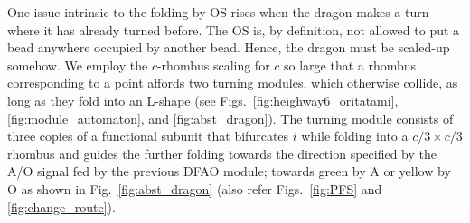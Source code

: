 \documentclass[runningheads]{llncs}
\begin{document}
One issue intrinsic to the folding by OS rises when the dragon makes a turn where it has already turned before. %
The OS is, by definition, not allowed to put a bead anywhere occupied by another bead. 
Hence, the dragon must be scaled-up somehow. 
We employ the $c$-rhombus scaling for $c$ so large that a rhombus corresponding to a point affords two turning modules, which otherwise collide, as long as they fold into an L-shape (see Figs.~\ref{fig:heighway6_oritatami}, \ref{fig:module_automaton}, and \ref{fig:abst_dragon}). 
The turning module consists of three copies of a functional subunit that bifurcates $i$ while folding into a $c/3 \times c/3$ rhombus and guides the further folding towards the direction specified by the A/O signal fed by the previous DFAO module; towards green by A or yellow by O as shown in Fig.~\ref{fig:abst_dragon} (also refer Figs.~\ref{fig:PFS} and \ref{fig:change_route}). 

\end{document}
